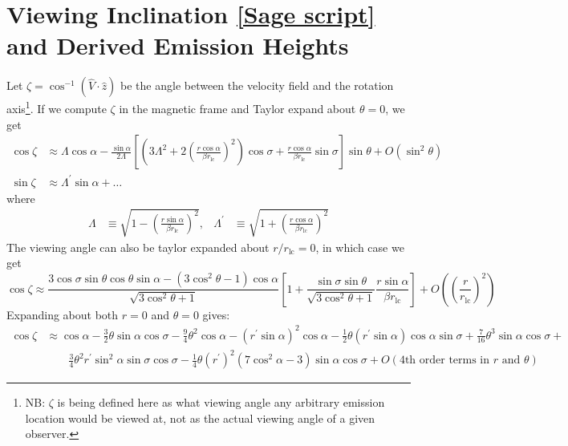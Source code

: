 \documentclass{book}
\newcommand{\rL}{r_\text{lc}} %
\newcommand{\linktosage}[1]{\hyperref[#1]{[Sage script]}}
\begin{document}
\section{Viewing Inclination \linktosage{sage:zeta} and Derived Emission Heights}
\label{sec:zeta}

Let $\zeta = \cos^{-1}(\hat{V}\cdot\hat{z})$ be the angle between the velocity field and the rotation axis\footnote{NB: $\zeta$ is being defined here as what viewing angle any arbitrary emission location would be viewed at, not as the actual viewing angle of a given observer.}.
If we compute $\zeta$ in the magnetic frame and Taylor expand about $\theta = 0$, we get
\begin{equation}
    \begin{aligned}
        \cos\zeta &\approx \Lambda\cos\alpha -
            \frac{\sin\alpha}{2\Lambda}\left[\left(3\Lambda^2 + 2\left(\frac{r\cos\alpha}{\beta \rL}\right)^2\right)\cos\sigma +
                \frac{r\cos\alpha}{\beta \rL}\sin\sigma\right] \sin\theta + O(\sin^2\theta) \\
        \sin\zeta &\approx \Lambda^\prime \sin\alpha + \dots
    \end{aligned}
    \label{eqn:zeta_th}
\end{equation}
where
\begin{align}
    \Lambda &\equiv \sqrt{1-\left(\frac{r\sin\alpha}{\beta \rL}\right)^2}, &
    \Lambda^\prime &\equiv \sqrt{1+\left(\frac{r\cos\alpha}{\beta \rL}\right)^2}
\end{align}
The viewing angle can also be taylor expanded about $r/\rL = 0$, in which case we get
\begin{equation}
    \cos\zeta \approx
        \frac{3\cos\sigma\sin\theta\cos\theta\sin\alpha - (3\cos^2\theta - 1)\cos\alpha}{\sqrt{3\cos^2\theta + 1}}
        \left[1 + \frac{\sin\sigma\sin\theta}{\sqrt{3\cos^2\theta+1}} \frac{r\sin\alpha}{\beta \rL}\right] +
        O\left(\left(\frac{r}{\rL}\right)^2\right)
    \label{eqn:viewingangle_taylor}
\end{equation}
Expanding about both $r = 0$ and $\theta = 0$ gives:
\begin{equation}
    \begin{aligned}
        \cos\zeta &\approx \cos\alpha - \frac32\theta\sin\alpha\cos\sigma -
            \frac94\theta^2\cos\alpha - (r^\prime\sin\alpha)^2\cos\alpha -
            \frac12\theta(r^\prime\sin\alpha)\cos\alpha\sin\sigma +
            \frac{7}{16}\theta^3\sin\alpha\cos\sigma + \\
            &\qquad \frac34 \theta^2 r^\prime\sin^2\alpha\sin\sigma\cos\sigma -
            \frac14 \theta (r^\prime)^2(7\cos^2\alpha-3)\sin\alpha\cos\sigma +
            O(\text{4th order terms in $r$ and $\theta$})
    \end{aligned}
\end{equation}
\end{document}
